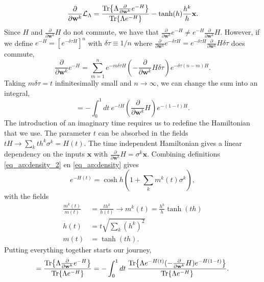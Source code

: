 \begin{equation*}
    \frac{\partial }{\partial \mathbf{w}^k} \mathcal{L}_\Lambda = \frac{\Tr{\Lambda \frac{\partial }{\partial \mathbf{w}^k} e^{-H}}}{\Tr{\Lambda e^{-H}}} - \tanh(h)\frac{h^k}{h} \mathbf{x}.
\end{equation*}
Since $H$ and $\frac{\partial }{\partial \mathbf{w}^k} H$ do not commute, we have that $\frac{\partial }{\partial \mathbf{w}^k} e^{-H} \neq e^{-H} \frac{\partial }{\partial \mathbf{w}^k} H$. However, if we define $e^{-H} = [e^{-\delta \tau H}]^n$ with $\delta\tau\equiv 1/n$ where $\frac{\partial }{\partial \mathbf{w}^k} e^{-\delta\tau H} = e^{-\delta\tau H} \frac{\partial }{\partial \mathbf{w}^k} H \delta\tau$ does commute,
\begin{equation*}
    \frac{\partial }{\partial \mathbf{w}^k} e^{-H} = \sum_{m=1}^n e^{-m \delta\tau  H} (- \frac{\partial }{\partial \mathbf{w}^k} H \delta\tau)e^{-\delta\tau(n-m) H}.
\end{equation*}
Taking $m\delta\tau = t$ infinitesimally small and $n\rightarrow\infty$, we can change the sum into an integral,
\begin{equation*}
    = -\int_{0}^1 dt\: e^{-t H} (\frac{\partial }{\partial \mathbf{w}^k} H)e^{-(1-t) H}.
\end{equation*}
The introduction of an imaginary time requires us to redefine the Hamiltonian that we use. The parameter $t$ can be absorbed in the fields $t H \rightarrow \sum_k t h^k \sigma^k = H(t)$. The time independent Hamiltonian gives a linear dependency on the inputs $\mathbf{x}$ with $\frac{\partial }{\partial \mathbf{w}^k} H = \sigma^k \mathbf{x}$. Combining definitions \ref{eq_ap:density_2} en \ref{eq_ap:density} gives
\begin{equation*}
    e^{-H(t)} = \cosh h \left(1 + \sum_k m^k(t) \sigma^k\right),
\end{equation*}
with the fields
\begin{align*}
    \frac{m^k(t)}{m(t)} &= \frac{th^k}{h(t)}\rightarrow m^k(t) = \frac{h^k}{h}\tanh(th)\\
    h(t) &= t \sqrt{\sum_k (h^k)^2}\\
    m(t) &= \tanh(th).
\end{align*}
Putting everything together starts our journey,
\begin{equation}
    = \frac{\Tr{\Lambda \frac{\partial }{\partial \mathbf{w}^k} e^{-H}}}{\Tr{\Lambda e^{-H}}} = -\int_{0}^1 dt\: \frac{\Tr{\Lambda e^{-H(t)} (-\frac{\partial }{\partial \mathbf{w}^k} H)e^{-H(1-t)}}}{\Tr{\Lambda e^{-H}}}
    \label{eq_ap:lh_tr_only}.
\end{equation}
